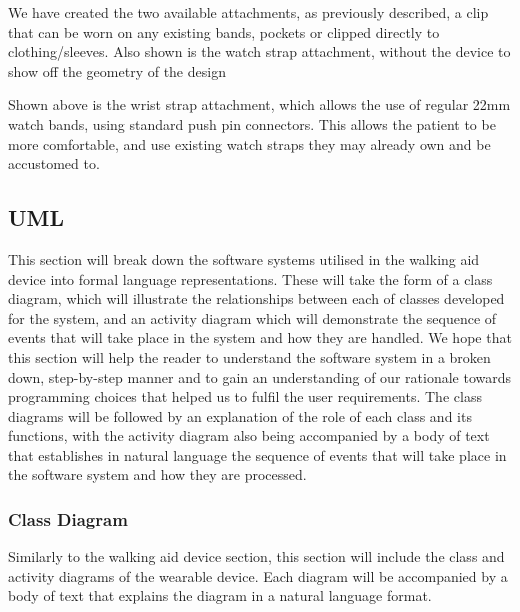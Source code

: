             

            We have created the two available attachments, as previously described, a clip that can be worn on any existing bands, pockets or clipped directly to clothing/sleeves. Also shown is the watch strap attachment, without the device to show off the geometry of the design

            

            Shown above is the wrist strap attachment, which allows the use of regular 22mm watch bands, using standard push pin connectors. This allows the patient to be more comfortable, and use existing watch straps they may already own and be accustomed to.



        \subsection{UML}
        \label{sec:uml_wearable}
        
            This section will break down the software systems utilised in the walking aid device into formal language representations. These will take the form of a class diagram, which will illustrate the relationships between each of classes developed for the system, and an activity diagram which will demonstrate the sequence of events that will take place in the system and how they are handled. We hope that this section will help the reader to understand the software system in a broken down, step-by-step manner and to gain an understanding of our rationale towards programming choices that helped us to fulfil the user requirements. The class diagrams will be followed by an explanation of the role of each class and its functions, with the activity diagram also being accompanied by a body of text that establishes in natural language the sequence of events that will take place in the software system and how they are processed.

            \subsubsection{Class Diagram}
            \label{subsubsec:class_diagram_wearable}

                Similarly to the walking aid device section, this section will include the class and activity diagrams of the wearable device. Each diagram will be accompanied by a body of text that explains the diagram in a natural language format.

